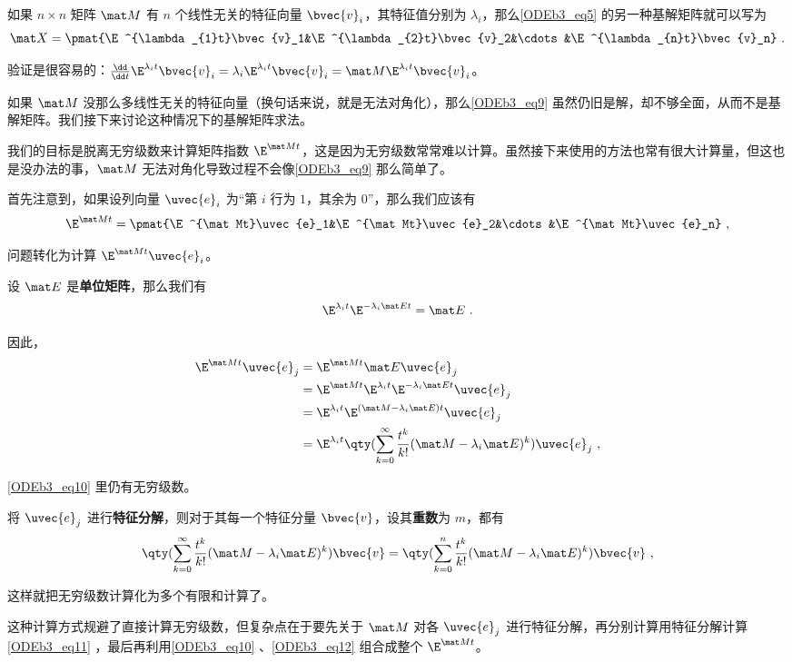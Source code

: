 如果 $n\times n$ 矩阵 $\mat M$ 有 $n$ 个线性无关的特征向量 $\bvec{v}_i$，其特征值分别为 $\lambda_i$，那么\autoref{ODEb3_eq5} 的另一种基解矩阵就可以写为
\begin{equation}\label{ODEb3_eq9}
\mat X=\pmat{\E^{\lambda_{1}t}\bvec{v}_1&\E^{\lambda_{2}t}\bvec{v}_2&\cdots&\E^{\lambda_{n}t}\bvec{v}_n}~.
\end{equation}

验证是很容易的：$\frac{\dd}{\dd t}\E^{\lambda_{i}t}\bvec{v}_i=\lambda_i\E^{\lambda_{i}t}\bvec{v}_i=\mat M\E^{\lambda_{i}t}\bvec{v}_i$。

如果 $\mat M$ 没那么多线性无关的特征向量（换句话来说，就是无法对角化），那么\autoref{ODEb3_eq9} 虽然仍旧是解，却不够全面，从而不是基解矩阵。我们接下来讨论这种情况下的基解矩阵求法。

我们的目标是脱离无穷级数来计算矩阵指数 $\E^{\mat Mt}$，这是因为无穷级数常常难以计算。虽然接下来使用的方法也常有很大计算量，但这也是没办法的事，$\mat M$ 无法对角化导致过程不会像\autoref{ODEb3_eq9} 那么简单了。

首先注意到，如果设列向量 $\uvec{e}_i$ 为“第 $i$ 行为 $1$，其余为 $0$”，那么我们应该有
\begin{equation}\label{ODEb3_eq12}
\E^{\mat Mt}=\pmat{\E^{\mat Mt}\uvec{e}_1&\E^{\mat Mt}\uvec{e}_2&\cdots&\E^{\mat Mt}\uvec{e}_n}~,
\end{equation}

问题转化为计算 $\E^{\mat Mt}\uvec{e}_i$。

设 $\mat E$ 是\textbf{单位矩阵}，那么我们有
\begin{equation}
\E^{\lambda_it}\E^{-\lambda_i\mat Et}=\mat E~.
\end{equation}

因此，
\begin{equation}\label{ODEb3_eq10}
\begin{aligned}
\E^{\mat Mt}\uvec{e}_j&=\E^{\mat Mt}\mat E\uvec{e}_j\\
&=\E^{\mat Mt}\E^{\lambda_it}\E^{-\lambda_i\mat Et}\uvec{e}_j\\
&=\E^{\lambda_it}\E^{(\mat M-\lambda_i\mat E)t}\uvec{e}_j\\
&=\E^{\lambda_it}\qty(\sum_{k=0}^\infty \frac{t^k}{k!}(\mat M-\lambda_i\mat E)^k)\uvec{e}_j~,
\end{aligned}
\end{equation}

\autoref{ODEb3_eq10} 里仍有无穷级数。

将 $\uvec{e}_j$ 进行\textbf{特征分解}，则对于其每一个特征分量 $\bvec{v}$，设其\textbf{重数}为 $m$，都有
\begin{equation}\label{ODEb3_eq11}
\qty(\sum_{k=0}^\infty \frac{t^k}{k!}(\mat M-\lambda_i\mat E)^k)\bvec{v}=\qty(\sum_{k=0}^n \frac{t^k}{k!}(\mat M-\lambda_i\mat E)^k)\bvec{v}~,
\end{equation}

这样就把无穷级数计算化为多个有限和计算了。

这种计算方式规避了直接计算无穷级数，但复杂点在于要先关于 $\mat M$ 对各 $\uvec{e}_j$ 进行特征分解，再分别计算用特征分解计算\autoref{ODEb3_eq11} ，最后再利用\autoref{ODEb3_eq10} 、\autoref{ODEb3_eq12} 组合成整个 $\E^{\mat Mt}$。









